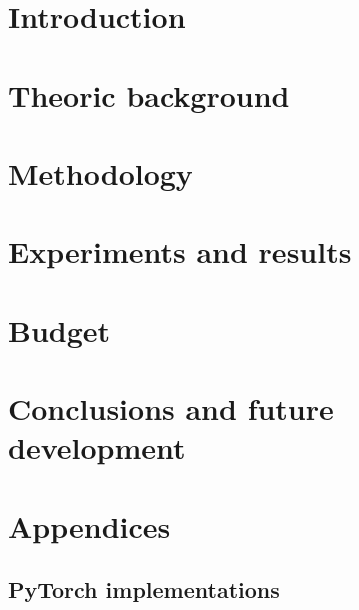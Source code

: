 \documentclass[a4paper,12pt,titlepage]{article}
\begin{document}
\listoffigures
\thispagestyle{empty}

\listoftables
\thispagestyle{empty}

\printglossary[type=\acronymtype,title=Acronyms]
\thispagestyle{empty}

\newpage
{}

\section{Introduction}\label{sec:introduction}


\section{Theoric background}\label{sec:theoric-background}



\section{Methodology}\label{sec:methodology}


\section{Experiments and results}\label{sec:experiments-and-results}


\section{Budget}\label{sec:budget}


\section{Conclusions and future development}\label{sec:conclusions-and-future-development}


\printbibliography

\appendix
\section*{Appendices}
\renewcommand{\thesubsection}{\Alph{subsection}}
\subsection{PyTorch implementations}

\end{document}
